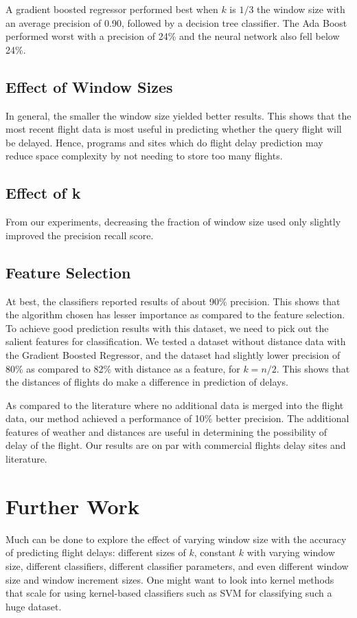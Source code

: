 \documentclass[letterpaper,11pt]{article}
\begin{document}
A gradient boosted regressor performed best when $k$ is $1/3$ the window size with an average precision of 0.90, followed by a decision tree classifier. The Ada Boost performed worst with a precision of 24\% and the neural network also fell below 24\%. 

\subsection{Effect of Window Sizes}
In general, the smaller the window size yielded better results. This shows that the most recent flight data is most useful in predicting whether the query flight will be delayed. Hence, programs and sites which do flight delay prediction may reduce space complexity by not needing to store too many flights. 

\subsection{Effect of k}
From our experiments, decreasing the fraction of window size used only slightly improved the precision recall score. 

\subsection{Feature Selection} 
At best, the classifiers reported results of about 90\% precision. This shows that the algorithm chosen has lesser importance as compared to the feature selection. To achieve good prediction results with this dataset, we need to pick out the salient features for classification. We tested a dataset without distance data with the Gradient Boosted Regressor, and the dataset had slightly lower precision of 80\% as compared to 82\% with distance as a feature, for $k=n/2$. This shows that the distances of flights do make a difference in prediction of delays. 

As compared to the literature where no additional data is merged into the flight data, our method achieved a performance of 10\% better precision. The additional features of weather and distances are useful in determining the possibility of delay of the flight. Our results are on par with commercial flights delay sites and literature. 

\section{Further Work}
Much can be done to explore the effect of varying window size with the accuracy of predicting flight delays: different sizes of $k$, constant $k$ with varying window size, different classifiers, different classifier parameters, and even different window size and window increment sizes. One might want to look into kernel methods that scale for using kernel-based classifiers such as SVM for classifying such a huge dataset. 
\end{document}
